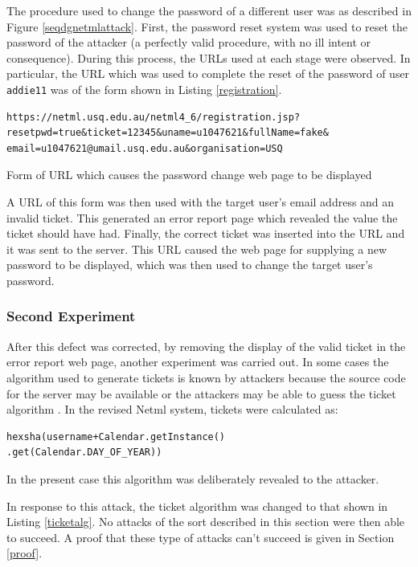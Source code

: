 The procedure used to change the password of a different user was as
described in Figure \ref{seqdgnetmlattack}. First, the password reset system was used to reset the password
of the attacker (a perfectly valid procedure, with no ill intent or 
consequence). During this process, the URLs used at each stage
were observed. In particular, the URL which was used to complete
the reset of the password of user \verb|addie11| was of the form
shown in Listing \ref{registration}.
\begin{listing}{\scriptsize
\begin{verbatim}
https://netml.usq.edu.au/netml4_6/registration.jsp?
resetpwd=true&ticket=12345&uname=u1047621&fullName=fake&
email=u1047621@umail.usq.edu.au&organisation=USQ
\end{verbatim}
}
\caption{Form of URL which causes the password change web page to be displayed}
\label{registration}
\end{listing}
A URL of this form was then used with the target user's email address and 
an invalid ticket. This generated an error report page which revealed
the value the ticket should have had. Finally, the correct ticket was
inserted into the URL and it was sent to the server. This URL caused
the web page for supplying a new password to be displayed, which was then
used to change the target user's password.

\subsubsection{Second Experiment}
After this defect was corrected, by removing the display of the valid
ticket in the error report web page, 
another experiment was carried out.
In some cases the algorithm used to generate tickets is known by attackers
because the source code for the server may be available or the attackers
may be able to guess the ticket algorithm
\cite{wang2018end}. In the revised Netml system, tickets were calculated as:
\begin{verbatim}
hexsha(username+Calendar.getInstance()
.get(Calendar.DAY_OF_YEAR))
\end{verbatim}
In the present case this algorithm was deliberately revealed to the attacker.

In response to this attack, the ticket algorithm was changed to that 
shown in Listing \ref{ticketalg}. No attacks of the sort
described in this section were then able to succeed. A proof that
these type of attacks can't succeed is given in Section \ref{proof}.



